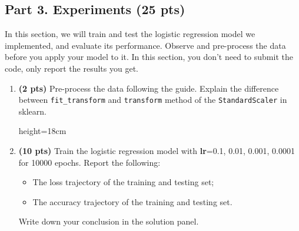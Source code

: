 \pagebreak
\subsection*{Part 3. Experiments (25 pts)}
In this section, we will train and test the logistic regression model we implemented, and evaluate its performance. 
Observe and pre-process the data before you apply your model to it. In this section, you don't need to submit the code, only report the results you get. 

\begin{enumerate}
    \item \textbf{(2 pts)} Pre-process the data following the guide. Explain the difference between \texttt{fit\_transform} and \texttt{transform} method of the \texttt{StandardScaler} in sklearn.
    \begin{soln}{height=18cm}
    \end{soln}
    
    \clearpage
    \item \textbf{(10 pts)} Train the logistic regression model with \textbf{lr}=0.1, 0.01, 0.001, 0.0001 for 10000 epochs. Report the following:
    \begin{itemize}
        \item The loss trajectory of the training and testing set;
        \item The accuracy trajectory of the training and testing set.
    \end{itemize} 
    
    Write down your conclusion in the solution panel.
    

\end{enumerate}
